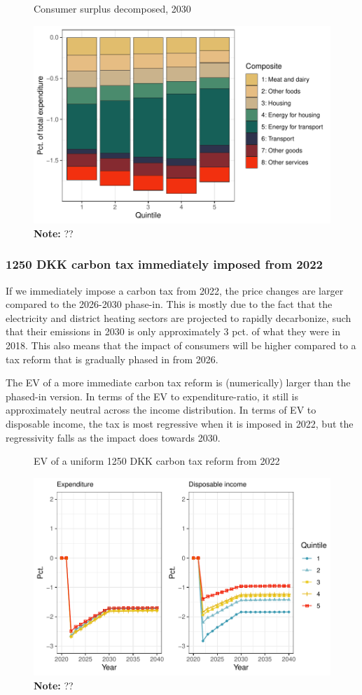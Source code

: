 \begin{figure}[H]
\centering
\caption{Consumer surplus decomposed, 2030}
\label{fig:cs_decomp}
\includegraphics[width=.8\textwidth]{Figures/IO-resultater/cs_decomposed_exp.pdf}
\captionsetup{singlelinecheck=off,size=scriptsize}
\setlength{\captionmargin}{10pt}
\caption*{
\textbf{Note:} ??\\}
\end{figure}

\subsubsection{1250 DKK carbon tax immediately imposed from 2022}
If we immediately impose a carbon tax from 2022, the price changes are larger compared to the 2026-2030 phase-in. This is mostly due to the fact that  the electricity and district heating sectors are projected to rapidly decarbonize, such that their emissions in 2030 is only approximately 3 pct. of what they were in 2018. This also means that the impact of consumers will be higher compared to a tax reform that is gradually phased in from 2026.

The EV of a more immediate carbon tax reform is (numerically) larger than the phased-in version. In terms of the EV to expenditure-ratio, it still is approximately neutral across the income distribution. In terms of EV to disposable income, the tax is most regressive when it is imposed in 2022, but the regressivity falls as the impact does towards 2030.

\begin{figure}[H]
\centering
\caption{EV of a uniform 1250 DKK carbon tax reform from 2022}
\label{figtax2022}
\includegraphics[width=.7\textwidth]{Figures/IO-resultater/timeEV_1250_straks.pdf}
\captionsetup{singlelinecheck=off,size=scriptsize}
\setlength{\captionmargin}{10pt}
\caption*{
\textbf{Note:} ??}
\end{figure}

